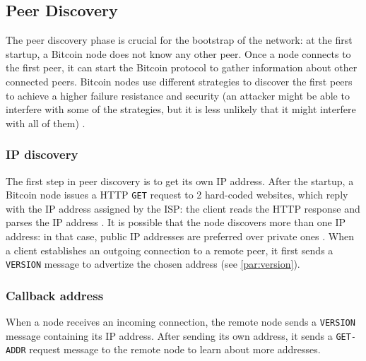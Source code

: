 \subsection{Peer Discovery}
\label{sub:discovery}
The peer discovery phase is crucial for the bootstrap of the network:
at the first startup, a Bitcoin node does not know any other peer.
Once a node connects to the first peer, it can start the Bitcoin protocol to gather information about other connected peers.
Bitcoin nodes use different strategies to discover the first peers to achieve a higher failure resistance and security (an attacker might be able to interfere with some of the strategies, but it is less unlikely that it might interfere with all of them) \cite{bitcoin_peer_discovery}.

\subsubsection{IP discovery}
The first step in peer discovery is to get its own IP address.
After the startup, a Bitcoin node issues a HTTP \texttt{GET} request to \num{2} hard-coded websites, which reply with the IP address assigned by the \ac{ISP}:
the client reads the HTTP response and parses the IP address \cite{bitcoin_peer_discovery}.
It is possible that the node discovers more than one IP address:
in that case, public IP addresses are preferred over private ones \cite{deanonymisation_2014}.
When a client establishes an outgoing connection to a remote peer, it first sends a \texttt{VERSION} message to advertize the chosen address (see \cref{par:version}).

\subsubsection{Callback address}
When a node receives an incoming connection, the remote node sends a \texttt{VERSION} message containing its IP address.
After sending its own address, it sends a \texttt{GET-ADDR} request message to the remote node to learn about more addresses.

